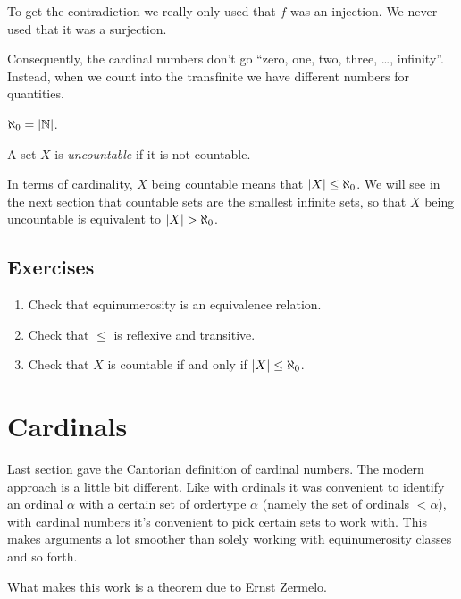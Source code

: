 \documentclass[10pt]{amsart}
\begin{document}
\begin{remark}
To get the contradiction we really only used that $f$ was an injection. We never used that it was a surjection.
\end{remark}

Consequently, the cardinal numbers don't go ``zero, one, two, three, \dots, infinity''. Instead, when we count into the transfinite we have different numbers for quantities.

\begin{definition}
$\aleph_0 = \left\lvert \mathbb{N} \right\rvert$.
\end{definition}

\begin{definition}
A set $X$ is \emph{uncountable} if it is not countable. 
\end{definition}

In terms of cardinality, $X$ being countable means that $\left\lvert X \right\rvert \le \aleph_0$. We will see in the next section that countable sets are the smallest infinite sets, so that $X$ being uncountable is equivalent to $\left\lvert X \right\rvert > \aleph_0$.

\subsection*{Exercises}

\begin{enumerate}
\item Check that equinumerosity is an equivalence relation.
\item Check that $\le$ is reflexive and transitive.
\item Check that $X$ is countable if and only if $\left\lvert X \right\rvert \le \aleph_0$.
\end{enumerate}

\newpage

\section{Cardinals}

Last section gave the Cantorian definition of cardinal numbers. The modern approach is a little bit different. Like with ordinals it was convenient to identify an ordinal $\alpha$ with a certain set of ordertype $\alpha$ (namely the set of ordinals $<\alpha$), with cardinal numbers it's convenient to pick certain sets to work with. This makes arguments a lot smoother than solely working with equinumerosity classes and so forth.

What makes this work is a theorem due to Ernst Zermelo.
\end{document}
